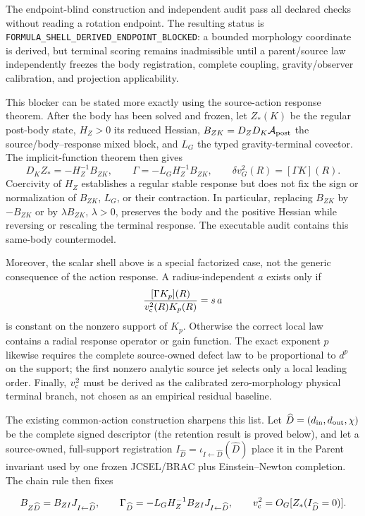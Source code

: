 \documentclass[11pt]{article}
\begin{document}
The endpoint-blind construction and independent audit pass all declared
checks without reading a rotation endpoint.  The resulting status is
\texttt{FORMULA\_SHELL\_DERIVED\_ENDPOINT\_BLOCKED}: a bounded morphology
coordinate is derived, but terminal scoring remains inadmissible until a
parent/source law independently freezes the body registration, complete
coupling, gravity/observer calibration, and projection applicability.

This blocker can be stated more exactly using the source-action response
theorem.  After the body has been solved and frozen, let \(Z_*(K)\) be the
regular post-body state, \(H_Z>0\) its reduced Hessian,
\(B_{ZK}=D_ZD_K\mathcal A_{\rm post}\) the source/body--response mixed block,
and \(L_G\) the typed gravity-terminal covector.  The implicit-function theorem
then gives
\[
D_KZ_*=-H_Z^{-1}B_{ZK},
\qquad
\Gamma=-L_GH_Z^{-1}B_{ZK},
\qquad
\delta v_G^2(R)=[\Gamma K](R).
\]
Coercivity of \(H_Z\) establishes a regular stable response but does not fix
the sign or normalization of \(B_{ZK}\), \(L_G\), or their contraction.  In
particular, replacing \(B_{ZK}\) by \(-B_{ZK}\) or by
\(\lambda B_{ZK}\), \(\lambda>0\), preserves the body and the positive Hessian
while reversing or rescaling the terminal response.  The executable audit
contains this same-body countermodel.

Moreover, the scalar shell above is a special factorized case, not the generic
consequence of the action response.  A radius-independent \(a\) exists only if
\[
\frac{[\Gamma K_p](R)}{v_{\rm c}^2(R)K_p(R)}=s\,a
\]
is constant on the nonzero support of \(K_p\).  Otherwise the correct local
law contains a radial response operator or gain function.  The exact exponent
\(p\) likewise requires the complete source-owned defect law to be
proportional to \(d^p\) on the support; the first nonzero analytic source jet
selects only a local leading order.  Finally, \(v_{\rm c}^2\) must be derived
as the calibrated zero-morphology physical terminal branch, not chosen as an
empirical residual baseline.

The existing common-action construction sharpens this list.  Let
$\widehat D=(d_{\rm in},d_{\rm out},\chi)$ be the complete signed descriptor
(the retention result is proved below), and let a source-owned, full-support
registration $I_{\widehat D}=\iota_{I\leftarrow\widehat D}(\widehat D)$ place
it in the Parent invariant used by one frozen JCSEL/BRAC plus
Einstein--Newton completion.  The chain rule then fixes

\[
B_{Z\widehat D}=B_{ZI}J_{I\leftarrow\widehat D},
\qquad
\Gamma_{\widehat D}=-L_GH_Z^{-1}B_{ZI}J_{I\leftarrow\widehat D},
\qquad
v_{\rm c}^2=O_G[Z_*(I_{\widehat D}=0)].
\]
\end{document}
